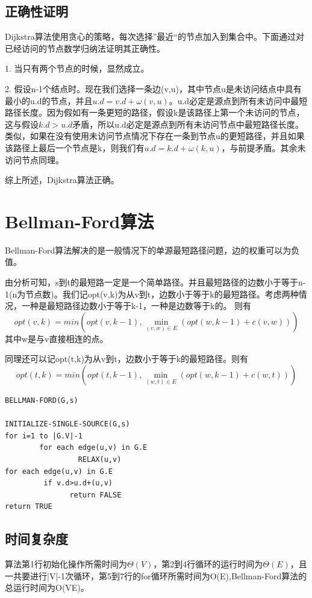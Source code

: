 \subsection{正确性证明}
Dijkstra算法使用贪心的策略，每次选择”最近“的节点加入到集合中。下面通过对已经访问的节点数学归纳法证明其正确性。

1. 当只有两个节点的时候，显然成立。

2. 假设n-1个结点时。现在我们选择一条边(v,u)，其中节点u是未访问结点中具有最小的u.d的节点，并且$u.d=v.d+\omega(v,u)$。u.d必定是源点到所有未访问中最短路径长度。因为假如有一条更短的路径，假设k是该路径上第一个未访问的节点，这与假设$k.d>u.d$矛盾，所以u.d必定是源点到所有未访问节点中最短路径长度。类似，如果在没有使用未访问节点情况下存在一条到节点u的更短路径，并且如果该路径上最后一个节点是k，则我们有$u.d=k.d+\omega(k,u)$，与前提矛盾。其余未访问节点同理。

综上所述，Dijkstra算法正确。

\section{Bellman-Ford算法}
Bellman-Ford算法解决的是一般情况下的单源最短路径问题，边的权重可以为负值。

由分析可知，s到t的最短路一定是一个简单路径。并且最短路径的边数小于等于n-1(n为节点数)。我们记opt(v,k)为从v到t，边数小于等于k的最短路径。考虑两种情况，一种是最短路径边数小于等于k-1，一种是边数等于k的。
则有
$$opt(v,k)=min(opt(v,k-1),\min \limits_{(v,w)\in E}(opt(w,k-1)+c(v,w)))$$
其中w是与v直接相连的点。

同理还可以记opt(t,k)为从v到t，边数小于等于k的最短路径。则有
$$opt(t,k)=min(opt(t,k-1),\min \limits_{(w,t)\in E}(opt(w,k-1)+c(w,t)))$$

\begin{lstlisting}[caption=Bellman-Ford算法算法伪代码]
BELLMAN-FORD(G,s)

INITIALIZE-SINGLE-SOURCE(G,s)
for i=1 to |G.V|-1
        for each edge(u,v) in G.E
		         RELAX(u,v)
for each edge(u,v) in G.E
         if v.d>u.d+(u,v)
		       return FALSE
return TRUE

\end{lstlisting}

\subsection{时间复杂度}
算法第1行初始化操作所需时间为$\Theta (V)$，第2到4行循环的运行时间为$\Theta (E)$，且一共要进行|V|-1次循环，第5到7行的for循环所需时间为O(E),Bellman-Ford算法的总运行时间为O(VE)。


